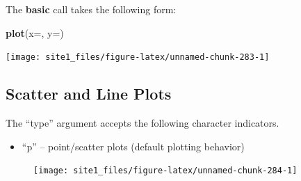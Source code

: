 \documentclass[]{book}
\newenvironment{Shaded}{\begin{snugshade}}{\end{snugshade}}
\newcommand{\KeywordTok}[1]{\textcolor[rgb]{0.13,0.29,0.53}{\textbf{#1}}}
\newcommand{\DataTypeTok}[1]{\textcolor[rgb]{0.13,0.29,0.53}{#1}}
\newcommand{\StringTok}[1]{\textcolor[rgb]{0.31,0.60,0.02}{#1}}
\newcommand{\OperatorTok}[1]{\textcolor[rgb]{0.81,0.36,0.00}{\textbf{#1}}}
\newcommand{\NormalTok}[1]{#1}
\providecommand{\tightlist}{%
  \setlength{\itemsep}{0pt}\setlength{\parskip}{0pt}}
\begin{document}
The \textbf{basic} call takes the following form:

\begin{Shaded}
\begin{Highlighting}[]
\KeywordTok{plot}\NormalTok{(}\DataTypeTok{x=}\NormalTok{, }\DataTypeTok{y=}\NormalTok{)}
\end{Highlighting}
\end{Shaded}

\begin{Shaded}
\end{Shaded}

\begin{center}\texttt{[image: site1\_files/figure-latex/unnamed-chunk-283-1]} \end{center}

\subsection{Scatter and Line Plots}\label{scatter-and-line-plots}

The ``type'' argument accepts the following character indicators.

\begin{itemize}
\tightlist
\item
  ``p'' -- point/scatter plots (default plotting behavior)
\end{itemize}

\begin{Shaded}
\end{Shaded}

\begin{figure}

{\centering \texttt{[image: site1\_files/figure-latex/unnamed-chunk-284-1]} 

}

\caption{ }\label{fig:unnamed-chunk-284}
\end{figure}
\end{document}
